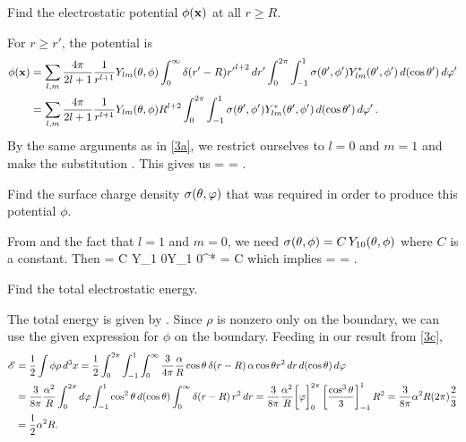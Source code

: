 \begin{problem} \label{3b}
	Find the electrostatic potential $\phi(\mathbf{x})$ at all $r \geq R$.
\end{problem}

\begin{solution}
	For $r \geq r'$, the potential is
	\begin{align*}
		\phi(\mathbf{x}) &= \sum_{l,m}\frac{4\pi}{2l + 1} \frac{1}{r^{l + 1}} Y_{l m}(\theta, \phi) \int_0^\infty \delta(r' - R) {r'}^{l+2} \dd{r'} \int_0^{2\pi} \int_{-1}^1 \sigma(\theta', \phi') Y_{l m}^*(\theta', \phi') \dd{(\cos\theta')} \dd{\varphi'} \\
		&= \sum_{l,m}\frac{4\pi}{2l + 1} \frac{1}{r^{l + 1}} Y_{l m}(\theta, \phi) R^{l+2} \int_0^{2\pi} \int_{-1}^1 \sigma(\theta', \phi') Y_{l m}^*(\theta', \phi') \dd{(\cos\theta')} \dd{\varphi'}.
	\end{align*}
	By the same arguments as in \ref{3a}, we restrict ourselves to $l = 0$ and $m = 1$ and make the substitution .  This gives us
	\beq
		\phix =    \cost {} 
		= \alp {} \cost.
	\eeq
\end{solution}
\vfix


\newcommand{\Er}{E_r}
\newcommand{\thh}{\boldsymbol{\hat{\tht}}}
\newcommand{\phh}{\boldsymbol{\hat{\vph}}}

\begin{problem} \label{3c}
	Find the surface charge density $\sigma(\theta, \varphi)$ that was required in order to produce this potential $\phi$.
\end{problem}

\begin{solution}
	From  and the fact that $l = 1$ and $m = 0$, we need $\sigma(\theta, \phi) = C \,Y_{1 0}(\theta, \phi)$ where $C$ is a constant.  Then
	\beq
		  = C \intotp \intono Y_{1 0}\tvp Y_{1 0}^*\tvp \dctp \dvp
		= C
	\eeq
	which implies
	\beq
		\sig\tv =    \cost =   \cost.
	\eeq
\end{solution}
\vfix


\newcommand{\dr}{\dd{r}}
\newcommand{\dct}{\dd{(\cost)}}
\newcommand{\dph}{\dd{\vph}}

\begin{problem}
	Find the total electrostatic energy.
\end{problem}

\begin{solution}
	The total energy is given by .  Since $\rho$ is nonzero only on the boundary, we can use the given expression for $\phi$ on the boundary.  Feeding in our result from \ref{3c}, 
	\begin{align*}
		\sE &= \frac{1}{2} \int \phi \rho \dcx
		= \frac{1}{2} \intotp \intono \intoi \frac{3}{4\pi} \frac{\alp}{R} \cost \, \delta(r - R) \, \alp \cost r^2 \dr \dct \dph \\
		&= \frac{3}{8\pi} \frac{\alp^2}{R} \intotp \dph \intono \cos^2\tht \dct \intoi \delta(r - R) \, r^2 \dr
		= \frac{3}{8\pi} \frac{\alp^2}{R} \bigg[ \vph \bigg]_0^{2\pi} \left[ \frac{\cos^3\tht}{3} \right]_{-1}^1 R^2
		= \frac{3}{8\pi} \alp^2 R (2\pi) \frac{2}{3} \\
		&= \frac{1}{2} \alp^2 R.
	\end{align*}
\end{solution}
\vfix